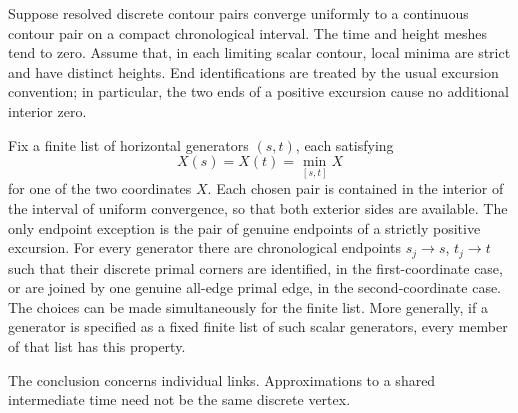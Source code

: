 \begin{lemma}
\label{bg:chord-approximation}
Suppose resolved discrete contour pairs converge uniformly to a
continuous contour pair on a compact chronological interval. The time
and height meshes tend to zero. Assume that, in each limiting scalar
contour, local minima are strict and have distinct heights. End
identifications are treated by the usual excursion convention; in
particular, the two ends of a positive excursion cause no additional
interior zero.

Fix a finite list of horizontal generators $(s,t)$, each satisfying
\[
 X(s)=X(t)=\min_{[s,t]}X
\]
for one of the two coordinates $X$. Each chosen pair is contained
in the interior of the interval of uniform convergence, so that both
exterior sides are available. The only endpoint exception is the
pair of genuine endpoints of a strictly positive excursion. For every generator there are
chronological endpoints $s_j\to s$, $t_j\to t$ such that their discrete
primal corners are identified, in the first-coordinate case, or are
joined by one genuine all-edge primal edge, in the second-coordinate
case. The choices can be made simultaneously for the finite list.
More generally, if a generator is specified as a fixed finite list of
such scalar generators, every member of that list has this property.

The conclusion concerns individual links. Approximations to a shared
intermediate time need not be the same discrete vertex.
\end{lemma}

